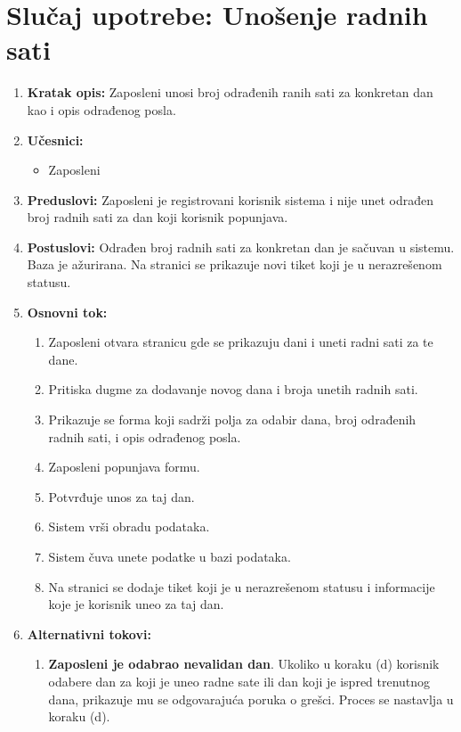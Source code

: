\documentclass[a4paper]{article}
\begin{document}
\section{Slučaj upotrebe: Unošenje radnih sati}
\begin{enumerate}
    \item \textbf{Kratak opis:} Zaposleni unosi broj odrađenih ranih sati za konkretan dan kao i opis odrađenog posla.
    \item \textbf{Učesnici:}
        \begin{itemize}
            \item Zaposleni
        \end{itemize}
    \item \textbf{Preduslovi:} Zaposleni je registrovani korisnik sistema i nije unet odrađen broj radnih sati za dan koji korisnik popunjava.
    \item \textbf{Postuslovi:} Odrađen broj radnih sati za konkretan dan je sačuvan u sistemu. Baza je ažurirana. Na stranici se prikazuje novi tiket koji je u nerazrešenom statusu.
    \item \textbf{Osnovni tok:}
        \begin{enumerate}
            \item Zaposleni otvara stranicu gde se prikazuju dani i uneti radni sati za te dane.
            \item Pritiska dugme za dodavanje novog dana i broja unetih radnih sati.
            \item Prikazuje se forma koji sadrži polja za odabir dana, broj odrađenih radnih sati, i opis odrađenog posla.
            \item Zaposleni popunjava formu.
            \item Potvrđuje unos za taj dan.
            \item Sistem vrši obradu podataka.
            \item Sistem čuva unete podatke u bazi podataka.
            \item Na stranici se dodaje tiket koji je u nerazrešenom statusu i informacije koje je korisnik uneo za taj dan.
        \end{enumerate}
    \item \textbf{Alternativni tokovi:}
        \begin{enumerate}
            \item \textbf{Zaposleni je odabrao nevalidan dan}. Ukoliko u koraku (d) korisnik odabere dan za koji je uneo radne sate ili dan koji je ispred trenutnog dana, prikazuje mu se odgovarajuća poruka o grešci. Proces se nastavlja u koraku (d).

\end{enumerate}
\end{enumerate}
\end{document}
